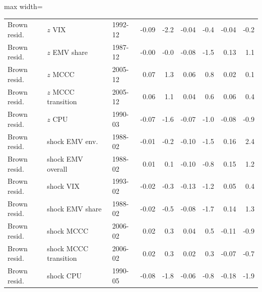 \begin{table}[H]
\begin{adjustbox}{max width=\linewidth}
\begin{tabular}{lllrrrrrr}
Brown resid. & $z$ VIX & 1992-12 & -0.09 & -2.2 & -0.04 & -0.4 & -0.04 & -0.2 \\
Brown resid. & $z$ EMV share & 1987-12 & -0.00 & -0.0 & -0.08 & -1.5 & 0.13 & 1.1 \\
Brown resid. & $z$ MCCC & 2005-12 & 0.07 & 1.3 & 0.06 & 0.8 & 0.02 & 0.1 \\
Brown resid. & $z$ MCCC transition & 2005-12 & 0.06 & 1.1 & 0.04 & 0.6 & 0.06 & 0.4 \\
Brown resid. & $z$ CPU & 1990-03 & -0.07 & -1.6 & -0.07 & -1.0 & -0.08 & -0.9 \\
Brown resid. & shock EMV env. & 1988-02 & -0.01 & -0.2 & -0.10 & -1.5 & 0.16 & 2.4 \\
Brown resid. & shock EMV overall & 1988-02 & 0.01 & 0.1 & -0.10 & -0.8 & 0.15 & 1.2 \\
Brown resid. & shock VIX & 1993-02 & -0.02 & -0.3 & -0.13 & -1.2 & 0.05 & 0.4 \\
Brown resid. & shock EMV share & 1988-02 & -0.02 & -0.5 & -0.08 & -1.7 & 0.14 & 1.3 \\
Brown resid. & shock MCCC & 2006-02 & 0.02 & 0.3 & 0.04 & 0.5 & -0.11 & -0.9 \\
Brown resid. & shock MCCC transition & 2006-02 & 0.02 & 0.3 & 0.02 & 0.3 & -0.07 & -0.7 \\
Brown resid. & shock CPU & 1990-05 & -0.08 & -1.8 & -0.06 & -0.8 & -0.18 & -1.9 \\
\bottomrule
\end{tabular}
\end{adjustbox}
\end{table}
